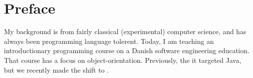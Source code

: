 \chapter*{Preface}

My background is from fairly classical (experimental) computer science, and has always been programming language tolerent. Today, I am teaching an introductionary programming course on a Danish software engineering education. That course has a focus on object-orientation. Previously, the it targeted Java, but we recently made the shift to \csharp.

